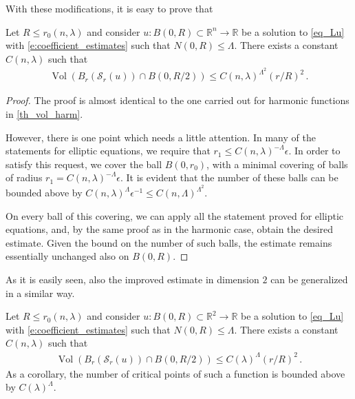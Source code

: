 \documentclass[11pt]{article}
\begin{document}
With these modifications, it is easy to prove that
\begin{theorem}
Let $R\leq r_0(n,\lambda)$ and consider $u:B(0,R)\subset {\mathbb{R}}^n\to {\mathbb{R}}$ be a solution to \eqref{eq_Lu} with \eqref{e:coefficient_estimates} such that $N(0,R)\leq \Lambda$. There exists a constant $C(n,\lambda)$ such that
 \begin{gather}
  {\operatorname{Vol}}{\left({B_r ({\mathcal{S}}_r(u))\cap B(0,R/2)}\right)} \leq C(n,\lambda)^{\Lambda ^2} {\left({r/R}\right)}^2\, .
 \end{gather}
\end{theorem}
\begin{proof}
 The proof is almost identical to the one carried out for harmonic functions in \ref{th_vol_harm}.
 
 However, there is one point which needs a little attention. In many of the statements for elliptic equations, we require that $r_1\leq C(n,\lambda)^{-\Lambda} \epsilon$. In order to satisfy this request, we cover the ball $B(0,r_0)$, with a minimal covering of balls of radius $r_1=C(n,\lambda)^{-\Lambda} \epsilon$. It is evident that the number of these balls can be bounded above by $C(n,\lambda)^\Lambda \epsilon^{-1}\leq C(n,\Lambda)^{\Lambda^2}$.
 
 On every ball of this covering, we can apply all the statement proved for elliptic equations, and, by the same proof as in the harmonic case, obtain the desired estimate. Given the bound on the number of such balls, the estimate remains essentially unchanged also on $B(0,R)$.

\end{proof}

As it is easily seen, also the improved estimate in dimension $2$ can be generalized in a similar way.
\begin{theorem}
 Let $R\leq r_0(n,\lambda)$ and consider $u:B(0,R)\subset {\mathbb{R}}^2\to {\mathbb{R}}$ be a solution to \eqref{eq_Lu} with \eqref{e:coefficient_estimates} such that $N(0,R)\leq \Lambda$. There exists a constant $C(n,\lambda)$ such that
 \begin{gather}
  {\operatorname{Vol}}{\left({B_r ({\mathcal{S}}_r(u))\cap B(0,R/2)}\right)} \leq C(\lambda)^\Lambda (r/R)^2\, .
 \end{gather}
As a corollary, the number of critical points of such a function is bounded above by $C(\lambda)^\Lambda$.
\end{theorem}

\clearpage
\end{document}
